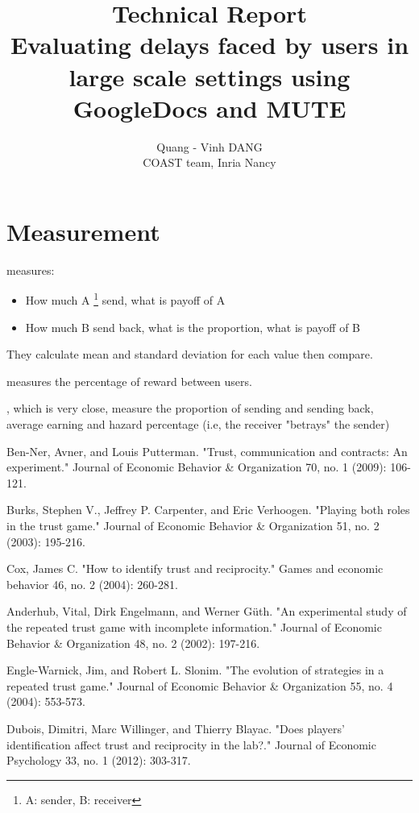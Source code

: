 \documentclass[a4paper,12pt]{article}
\begin{document}
	\author{Quang - Vinh DANG \\ COAST team, Inria Nancy}
	\title{Technical Report\\ Evaluating delays faced by users in large scale settings using GoogleDocs and MUTE}\maketitle

\section{Measurement}

\cite{R1, R2, R3, R6} measures:
\begin{itemize}
	\item How much A \footnote{A: sender, B: receiver} send, what is payoff of A
	\item How much B send back, what is the proportion, what is payoff of B
\end{itemize}

They calculate mean and standard deviation for each value then compare.

\cite{R4} measures the percentage of reward between users.

\cite {R5}, which is very close, measure the proportion of sending and sending back, average earning and hazard percentage (i.e, the receiver "betrays" the sender)
\begin{thebibliography}{99}

 Ben-Ner, Avner, and Louis Putterman. "Trust, communication and contracts: An experiment." Journal of Economic Behavior \& Organization 70, no. 1 (2009): 106-121.

 Burks, Stephen V., Jeffrey P. Carpenter, and Eric Verhoogen. "Playing both roles in the trust game." Journal of Economic Behavior \& Organization 51, no. 2 (2003): 195-216.

 Cox, James C. "How to identify trust and reciprocity." Games and economic behavior 46, no. 2 (2004): 260-281.

 Anderhub, Vital, Dirk Engelmann, and Werner Güth. "An experimental study of the repeated trust game with incomplete information." Journal of Economic Behavior \& Organization 48, no. 2 (2002): 197-216. 

 Engle-Warnick, Jim, and Robert L. Slonim. "The evolution of strategies in a repeated trust game." Journal of Economic Behavior \& Organization 55, no. 4 (2004): 553-573.

 Dubois, Dimitri, Marc Willinger, and Thierry Blayac. "Does players’ identification affect trust and reciprocity in the lab?." Journal of Economic Psychology 33, no. 1 (2012): 303-317.
\end{thebibliography}	
\end{document}
